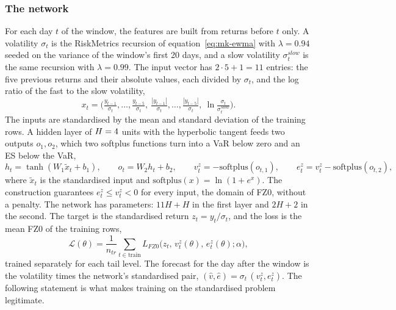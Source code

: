 \subsubsection{The network}
For each day $t$ of the window, the features are built from returns before $t$ only. A volatility $\sigma_t$ is the RiskMetrics recursion of equation~\eqref{eq:mk-ewma} with $\lambda=0.94$ seeded on the variance of
the window's first 20 days, and a slow volatility $\sigma_t^{slow}$ is the same recursion with $\lambda=0.99$. The input vector has $2\cdot5+1=11$ entries: the five previous returns and their absolute values, each divided by
$\sigma_t$, and the log ratio of the fast to the slow volatility,
\begin{equation}
x_t=\Big(\tfrac{y_{t-1}}{\sigma_t},\dots,\tfrac{y_{t-5}}{\sigma_t},\ \tfrac{|y_{t-1}|}{\sigma_t},\dots,\tfrac{|y_{t-5}|}{\sigma_t},\ \ln\tfrac{\sigma_t}{\sigma_t^{slow}}\Big).
\label{eq:mk-nn-feat}
\end{equation}
The inputs are standardised by the mean and standard deviation of the training rows. A hidden layer of $H=4{}$ units with the hyperbolic tangent feeds two outputs $o_1,o_2$, which two softplus functions turn into a VaR below
zero and an ES below the VaR,
\begin{equation}
h_t=\tanh\!\left(W_1\tilde x_t+b_1\right),\qquad o_t=W_2h_t+b_2,\qquad
v_t^{z}=-\mathrm{softplus}(o_{t,1}),\qquad e_t^{z}=v_t^{z}-\mathrm{softplus}(o_{t,2}),
\label{eq:mk-nn-out}
\end{equation}
where $\tilde x_t$ is the standardised input and $\mathrm{softplus}(x)=\ln(1+e^x)$. The construction guarantees $e_t^z\le v_t^z<0$ for every input, the domain of FZ0, without a penalty. The network has
\mkNnParams{} parameters: $11H+H$ in the first layer and $2H+2$ in the second. The target is the standardised return $z_t=y_t/\sigma_t$, and the loss is the mean FZ0 of the training rows,
\begin{equation}
\mathcal L(\theta)=\frac1{n_{tr}}\sum_{t\in\mathrm{train}}L_{FZ0}\big(z_t,\,v^z_t(\theta),\,e^z_t(\theta);\alpha\big),
\label{eq:mk-nn-loss}
\end{equation}
trained separately for each tail level. The forecast for the day after the window is the volatility times the network's standardised pair, $(\widehat v,\widehat e)=\sigma_{t}\,(v^z_t,e^z_t)$. The
following statement is what makes training on the standardised problem legitimate.

